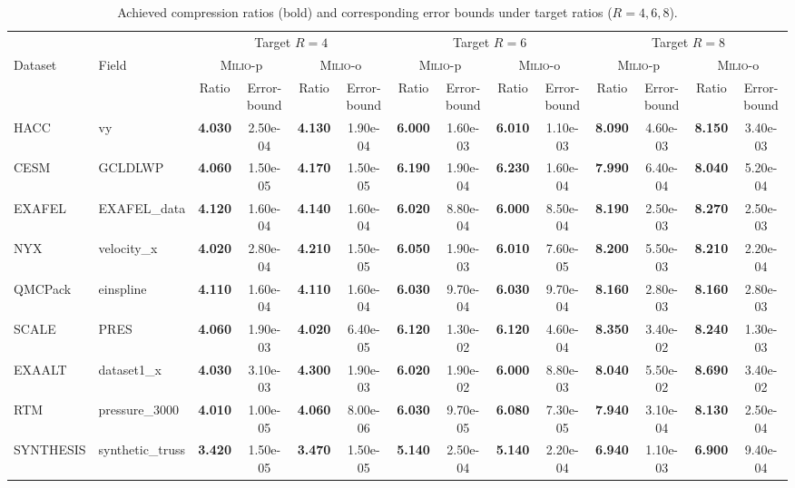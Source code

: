 \begin{table}[t]
\centering
\caption{Achieved compression ratios (bold) and corresponding error bounds under target ratios ($R=4,6,8$).}
\begin{tabular}{llcccccccccccc}
\toprule
 & & \multicolumn{4}{c}{Target $R=4$} & \multicolumn{4}{c}{Target $R=6$} & \multicolumn{4}{c}{Target $R=8$} \\
Dataset & Field & \multicolumn{2}{c}{\textsc{Milio}-p} & \multicolumn{2}{c}{\textsc{Milio}-o} & \multicolumn{2}{c}{\textsc{Milio}-p} & \multicolumn{2}{c}{\textsc{Milio}-o} & \multicolumn{2}{c}{\textsc{Milio}-p} & \multicolumn{2}{c}{\textsc{Milio}-o} \\
 & & Ratio & Error-bound & Ratio & Error-bound & Ratio & Error-bound & Ratio & Error-bound & Ratio & Error-bound & Ratio & Error-bound \\
\midrule
HACC & vy & \textbf{4.030} & 2.50e-04 & \textbf{4.130} & 1.90e-04 & \textbf{6.000} & 1.60e-03 & \textbf{6.010} & 1.10e-03 & \textbf{8.090} & 4.60e-03 & \textbf{8.150} & 3.40e-03 \\
CESM & GCLDLWP & \textbf{4.060} & 1.50e-05 & \textbf{4.170} & 1.50e-05 & \textbf{6.190} & 1.90e-04 & \textbf{6.230} & 1.60e-04 & \textbf{7.990} & 6.40e-04 & \textbf{8.040} & 5.20e-04 \\
EXAFEL & EXAFEL\_data & \textbf{4.120} & 1.60e-04 & \textbf{4.140} & 1.60e-04 & \textbf{6.020} & 8.80e-04 & \textbf{6.000} & 8.50e-04 & \textbf{8.190} & 2.50e-03 & \textbf{8.270} & 2.50e-03 \\
NYX & velocity\_x & \textbf{4.020} & 2.80e-04 & \textbf{4.210} & 1.50e-05 & \textbf{6.050} & 1.90e-03 & \textbf{6.010} & 7.60e-05 & \textbf{8.200} & 5.50e-03 & \textbf{8.210} & 2.20e-04 \\
QMCPack & einspline & \textbf{4.110} & 1.60e-04 & \textbf{4.110} & 1.60e-04 & \textbf{6.030} & 9.70e-04 & \textbf{6.030} & 9.70e-04 & \textbf{8.160} & 2.80e-03 & \textbf{8.160} & 2.80e-03 \\
SCALE & PRES & \textbf{4.060} & 1.90e-03 & \textbf{4.020} & 6.40e-05 & \textbf{6.120} & 1.30e-02 & \textbf{6.120} & 4.60e-04 & \textbf{8.350} & 3.40e-02 & \textbf{8.240} & 1.30e-03 \\
EXAALT & dataset1\_x & \textbf{4.030} & 3.10e-03 & \textbf{4.300} & 1.90e-03 & \textbf{6.020} & 1.90e-02 & \textbf{6.000} & 8.80e-03 & \textbf{8.040} & 5.50e-02 & \textbf{8.690} & 3.40e-02 \\
RTM & pressure\_3000 & \textbf{4.010} & 1.00e-05 & \textbf{4.060} & 8.00e-06 & \textbf{6.030} & 9.70e-05 & \textbf{6.080} & 7.30e-05 & \textbf{7.940} & 3.10e-04 & \textbf{8.130} & 2.50e-04 \\
SYNTHESIS & synthetic\_truss & \textbf{3.420} & 1.50e-05 & \textbf{3.470} & 1.50e-05 & \textbf{5.140} & 2.50e-04 & \textbf{5.140} & 2.20e-04 & \textbf{6.940} & 1.10e-03 & \textbf{6.900} & 9.40e-04 \\
\bottomrule
\end{tabular}
\end{table}
